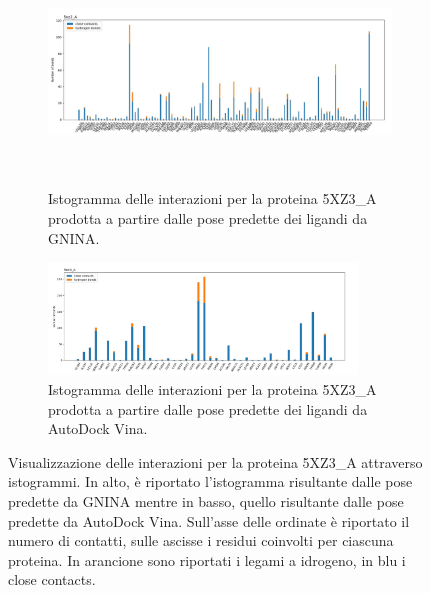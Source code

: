 \begin{figure}
    \centering
    \begin{subfigure}[b]{\textwidth}
        \centering
        \includegraphics[width=\textwidth, height=6cm]{images/interactions/interactions_gnina_5xz3_a.jpg}
        \caption[]%
        {{\small Istogramma delle interazioni per la proteina 5XZ3\_A prodotta a partire dalle pose predette dei ligandi da GNINA.}}    
        \label{fig:interactions_gnina_5xz3_a}
    \end{subfigure}
    \hfill
    \begin{subfigure}[b]{\textwidth}  
        \centering 
        \includegraphics[width=0.9\textwidth, height=3cm]{images/interactions/interactions_vina_5xz3_a.jpg}
        \caption[]%
        {{\small Istogramma delle interazioni per la proteina 5XZ3\_A prodotta a partire dalle pose predette dei ligandi da AutoDock Vina.}}    
        \label{fig:interactions_vina_5xz3_a}
    \end{subfigure}
    \caption[Visualizzazione degli istogrammi per la proteina 5XZ3\_A.]
    {\small Visualizzazione delle interazioni per la proteina 5XZ3\_A attraverso istogrammi. In alto, è riportato l'istogramma risultante dalle pose predette da GNINA mentre in basso, quello risultante dalle pose predette da AutoDock Vina. Sull'asse delle ordinate è riportato il numero di contatti, sulle ascisse i residui coinvolti per ciascuna proteina. In arancione sono riportati i legami a idrogeno, in blu i close contacts.} 
    \label{fig:int_5xz3_a}
\end{figure}


